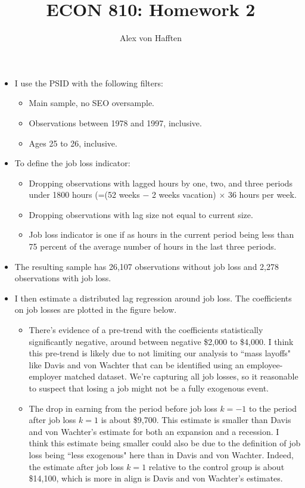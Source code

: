 \documentclass{article}
\title{ECON 810: Homework 2}
\author{Alex von Hafften }
\begin{document}
\maketitle

\begin{itemize}

\section{Data}

\item I use the PSID with the following filters:

\begin{itemize}
\item Main sample, no SEO oversample.
\item Observations between 1978 and 1997, inclusive.
\item Ages 25 to 26, inclusive.
\end{itemize}

\item To define the job loss indicator:

\begin{itemize}
\item Dropping observations with lagged hours by one, two, and three periods under 1800 hours (=(52 weeks $-$ 2 weeks vacation) $\times$ 36 hours per week.
\item Dropping observations with lag size not equal to current size.
\item Job loss indicator is one if as hours in the current period being less than 75 percent of the average number of hours in the last three periods.
\end{itemize}

\item The resulting sample has 26,107 observations without job loss and 2,278 observations with job loss.

\item I then estimate a distributed lag regression around job loss.  The coefficients on job losses are plotted in the figure below.

\begin{itemize}
\item There's evidence of a pre-trend with the coefficients statistically significantly negative, around between negative \$2,000 to \$4,000.  I think this pre-trend is likely due to not limiting our analysis to ``mass layoffs" like Davis and von Wachter that can be identified using an employee-employer matched dataset.  We're capturing all job losses, so it reasonable to suspect that losing a job might not be a fully exogenous event.
\item The drop in earning from the period before job loss $k = -1$ to the period after job loss $k = 1$ is about \$9,700.  This estimate is smaller than Davis and von Wachter's estimate for both an expansion and a recession. I think this estimate being smaller could also be due to the definition of job loss being ``less exogenous" here than in Davis and von Wachter.  Indeed, the estimate after job loss $k=1$ relative to the control group is about \$14,100, which is more in align is Davis and von Wachter's estimates.


\end{itemize}
\end{itemize}
\end{document}
